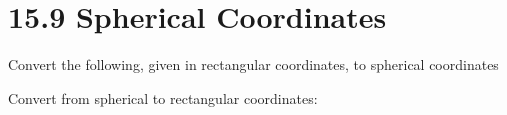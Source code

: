 \documentclass[12pt]{exam}
\newcommand{\qdate}{15.9 Spherical Coordinates} %
\begin{document}
\section*{\qdate}


\begin{questions}

\question Convert the following, given in rectangular coordinates, to spherical coordinates

\question Convert from spherical to rectangular coordinates:
\begin{parts}
    
\end{parts}


\end{questions}
\end{document}
